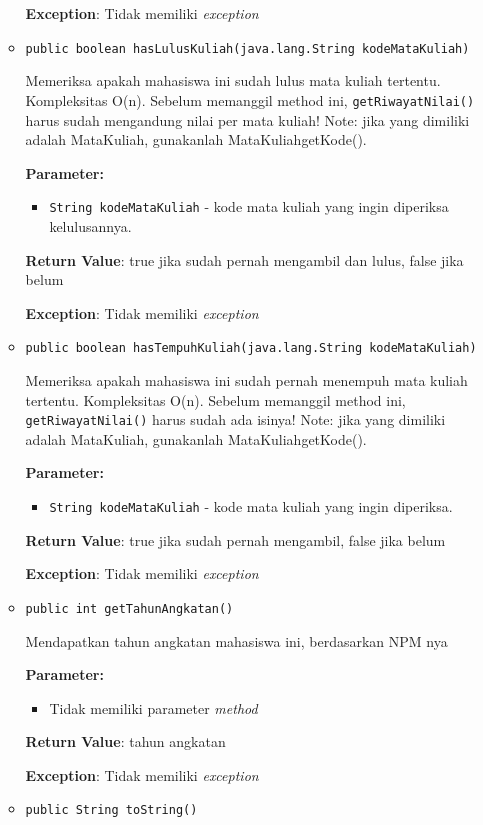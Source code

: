 \documentclass{article}
\begin{document}
\begin{enumerate}
\begin{itemize}
\textbf{Exception}: Tidak memiliki \textit{exception}

\item \texttt{public boolean hasLulusKuliah(java.lang.String kodeMataKuliah)}

Memeriksa apakah mahasiswa ini sudah lulus mata kuliah tertentu. Kompleksitas O(n).
 Sebelum memanggil method ini, \texttt{getRiwayatNilai()} harus sudah mengandung nilai per mata kuliah!
 Note: jika yang dimiliki adalah MataKuliah, gunakanlah MataKuliahgetKode().

\textbf{Parameter:}
\begin{itemize}
\item \texttt{String kodeMataKuliah} - 
kode mata kuliah yang ingin diperiksa kelulusannya.
\end{itemize}
\textbf{Return Value}: true jika sudah pernah mengambil dan lulus, false jika belum

\textbf{Exception}: Tidak memiliki \textit{exception}

\item \texttt{public boolean hasTempuhKuliah(java.lang.String kodeMataKuliah)}

Memeriksa apakah mahasiswa ini sudah pernah menempuh mata kuliah tertentu. Kompleksitas O(n).
 Sebelum memanggil method ini, \texttt{getRiwayatNilai()} harus sudah ada isinya!
 Note: jika yang dimiliki adalah MataKuliah, gunakanlah MataKuliahgetKode().

\textbf{Parameter:}
\begin{itemize}
\item \texttt{String kodeMataKuliah} - 
kode mata kuliah yang ingin diperiksa.
\end{itemize}
\textbf{Return Value}: true jika sudah pernah mengambil, false jika belum

\textbf{Exception}: Tidak memiliki \textit{exception}

\item \texttt{public int getTahunAngkatan()}

Mendapatkan tahun angkatan mahasiswa ini, berdasarkan NPM nya

\textbf{Parameter:}
\begin{itemize}
\item Tidak memiliki parameter \textit{method}
\end{itemize}
\textbf{Return Value}: tahun angkatan

\textbf{Exception}: Tidak memiliki \textit{exception}

\item \texttt{public String toString()}




\end{itemize}
\end{enumerate}
\end{document}
